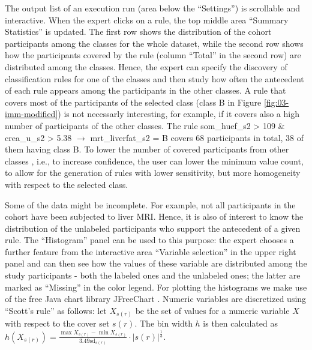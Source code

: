 \documentclass[
  oneside]{book}
\begin{document}
The output list of an execution run (area below the ``Settings'') is scrollable and interactive.
When the expert clicks on a rule, the top middle area ``Summary Statistics'' is updated.
The first row shows the distribution of the cohort participants among the classes for the whole dataset, while the second row shows how the participants covered by the rule (column ``Total'' in the second row) are distributed among the classes.
Hence, the expert can specify the discovery of classification rules for one of the classes and then study how often the antecedent of each rule appears among the participants in the other classes.
A rule that covers most of the participants of the selected class (class B in Figure \ref{fig:03-imm-modified}) is not necessarly interesting, for example, if it covers also a high number of participants of the other classes.
The rule som\_huef\_s2 \textgreater{} 109 \& crea\_u\_s2 \textgreater{} 5.38 \(\longrightarrow\) mrt\_liverfat\_s2 = B covers 68 participants in total, 38 of them having class B.
To lower the number of covered participants from other classes , i.e., to increase confidence, the user can lower the minimum value count, to allow for the generation of rules with lower sensitivity, but more homogeneity with respect to the selected class.

Some of the data might be incomplete. For example, not all participants in the cohort have been subjected to liver MRI.
Hence, it is also of interest to know the distribution of the unlabeled participants who support the antecedent of a given rule.
The ``Histogram'' panel can be used to this purpose: the expert chooses a further feature from the interactive area ``Variable selection'' in the upper right panel and can then see how the values of these variable are distributed among the study participants - both the labeled ones and the unlabeled ones; the latter are marked as ``Missing'' in the color legend.
For plotting the histograms we make use of the free Java chart library JFreeChart \cite{GilbertJFree}.
Numeric variables are discretized using ``Scott's rule'' \autocite{scott1979optimal} as follows:
let \(X_{s(r)}\) be the set of values for a numeric variable \(X\) with respect to the cover set \(s(r)\).
The bin width \(h\) is then calculated as \(h(X_{s(r)})=\frac{\max{X_{s(r)}}-\min{X_{s(r)}}}{3.49\text{sd}_{s(r)}}\cdot |s(r)|^{\frac{1}{3}}\).
\end{document}
